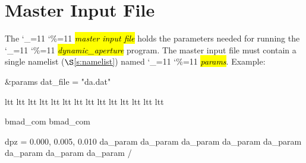 \documentclass{hitec}
\newcommand\dottcmd[1]{\hl{\em#1}\endgroup}
\newcommand{\vn}{\begingroup\catcode`\_=11 \catcode`\%=11 \dottcmd}
\newcommand{\da}{\vn{dynamic_aperture}\xspace}
\newcommand{\sref}[1]{$\S$\ref{#1}}
\newcommand{\Section}[1]{\section{#1}\vspace*{-1ex}}
\begin{document}
\Section{Master Input File}
\label{s:input}

The \vn{master input file} holds the parameters needed for running the \da program. The master input
file must contain a single namelist (\sref{s:namelist}) named \vn{params}.  Example:
\begin{code}
&params
  dat_file = "da.dat"

  ltt%
  ltt%
  ltt%
  ltt%
  ltt%
  ltt%
  ltt%
  ltt%
  ltt%
  ltt%
  ltt%
  ltt%
  ltt%
  ltt%

  bmad_com%
  bmad_com%

  dpz = 0.000, 0.005, 0.010
  da_param%
  da_param%
  da_param%
  da_param%
  da_param%
  da_param%
  da_param%
  da_param%
/
\end{code}
\end{document}
